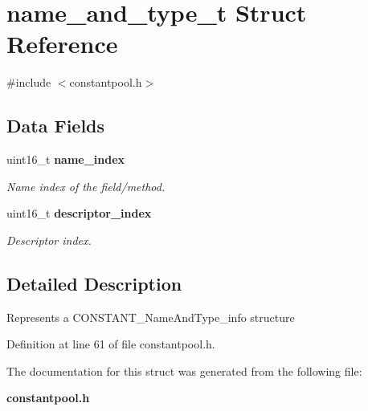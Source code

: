 \section{name\_\-and\_\-type\_\-t Struct Reference}
\label{structname__and__type__t}


{\ttfamily \#include $<$constantpool.h$>$}

\subsection*{Data Fields}
\begin{DoxyCompactItemize}
\item 
uint16\_\-t {\bf name\_\-index}\label{structname__and__type__t_ab1696cbc4f11fe23b8b4c833e72674e5}

\begin{DoxyCompactList}\small\item\em Name index of the field/method. \item\end{DoxyCompactList}\item 
uint16\_\-t {\bf descriptor\_\-index}\label{structname__and__type__t_a479c5bbc76a9e9ebf5f28c34e13f5513}

\begin{DoxyCompactList}\small\item\em Descriptor index. \item\end{DoxyCompactList}\end{DoxyCompactItemize}


\subsection{Detailed Description}
Represents a CONSTANT\_\-NameAndType\_\-info structure 

Definition at line 61 of file constantpool.h.



The documentation for this struct was generated from the following file:\begin{DoxyCompactItemize}
\item 
{\bf constantpool.h}\end{DoxyCompactItemize}
